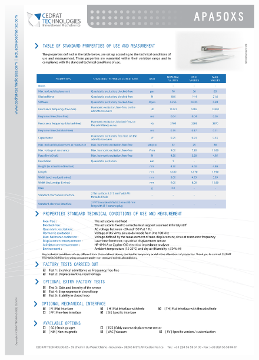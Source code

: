 \begin{figure}[!p]
\begin{center}
\includegraphics[page=2,trim={0cm 0cm 0cm 0cm},clip,scale=0.7]{../Annexes/Figure/APA50XS.pdf}
\end{center}
\end{figure}
\FloatBarrier


